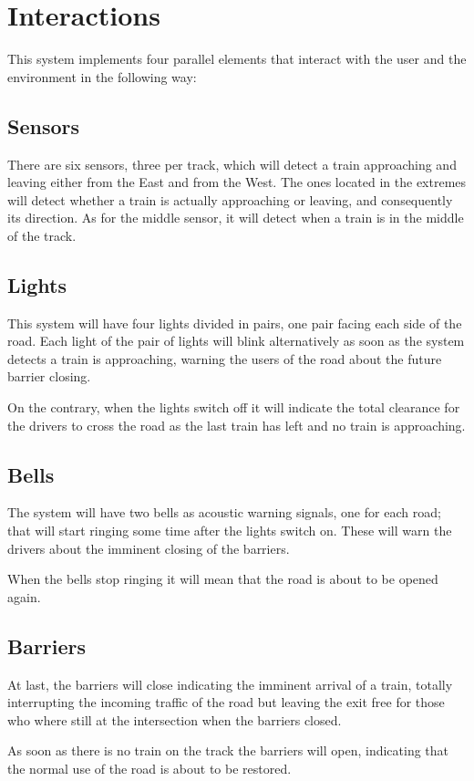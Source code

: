 \documentclass[final]{report}
\begin{document}
\chapter{Interactions}
This system implements four parallel elements that interact with the user and the environment in the following way: 

\section{Sensors}
There are six sensors, three per track, which will detect a train approaching and leaving either from the East and from the West. 
The ones located in the extremes will detect whether a train is actually approaching or leaving, and consequently its direction. 
As for the middle sensor, it will detect when a train is in the middle of the track.

\section{Lights}
This system will have four lights divided in pairs, one pair facing each side of the road.
Each light of the pair of lights will blink alternatively as soon as the system detects a train is approaching, warning the users of the road about the future barrier closing.

On the contrary, when the lights switch off it will indicate the total clearance for the drivers to cross the road as the last train has left and no train is approaching.

\section{Bells}
The system will have two bells as acoustic warning signals, one for each road; that will start ringing some time after the lights switch on.
These will warn the drivers about the imminent closing of the barriers.

When the bells stop ringing it will mean that the road is about to be opened again. 
 

\section{Barriers}
At last, the barriers will close indicating the imminent arrival of a train, totally interrupting the incoming traffic of the road but leaving the exit free for those who where still at the intersection when the barriers closed.

As soon as there is no train on the track the barriers will open, indicating that the normal use of the road is about to be restored.
\end{document}
